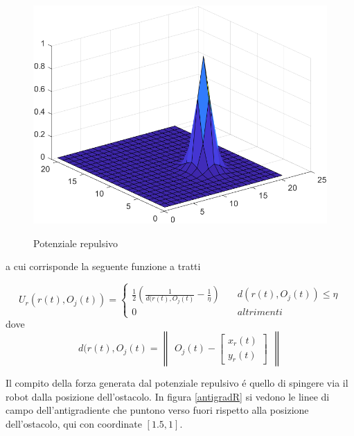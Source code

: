\documentclass[14pt,twoside,a4paper]{extarticle}
\begin{document}
\begin{description}
\begin{figure}[H]
\caption{Potenziale repulsivo}
\includegraphics[width=\textwidth]{potR.png}
\label{potR}
\end{figure}

a cui corrisponde la seguente funzione a tratti 

\begin{equation}
U_r(r(t),O_j(t)) = 
\begin{cases}
\frac{1}{2} \left( \frac{1}{d(r(t),O_j(t)} - \frac{1}{\eta} \right) \quad &d(r(t),O_j(t)) \leq \eta \\
0 \quad &altrimenti
\end{cases}
\end{equation}
dove \[ d(r(t),O_j(t) = \begin{Vmatrix}O_j(t) - \begin{bmatrix} x_r(t)\\ y_r(t) \end{bmatrix}\end{Vmatrix}\]

Il compito della forza generata dal potenziale repulsivo é quello di spingere via il robot dalla posizione dell'ostacolo. In figura \ref{antigradR} si vedono le linee di campo dell'antigradiente che puntono verso fuori rispetto alla posizione dell'ostacolo, qui con coordinate \([1.5, 1]\).


\end{description}
\end{document}
